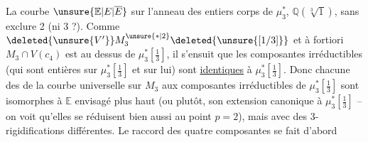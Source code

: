  La courbe $\unsure{\mathbb E|E|\overline E}$  sur  l'anneau des entiers  corps de $\mu_3^*$,  $\mathbb Q(\sqrt[3]{1})$,  sans exclure 2 (ni 3 ?). Comme $\deleted{\unsure{V'}}M_3^{\unsure{*|2}}\deleted{\unsure{[1/3]}}$ et à fortiori $M_3\cap V(c_4)$ est au dessus de $\mu_3^*[\frac13]$, il s'ensuit que les composantes irréductibles (qui sont entières sur $\mu_3^*[\frac13]$ et  sur lui) sont \uline{identiques} à $\mu_3^*[\frac13]$. Donc chacune des  de la courbe  universelle sur $M_3$ aux composantes irréductibles de $\mu_3^*[\frac13]$ sont isomorphes à $\mathbb E$ envisagé plus haut (ou plutôt, son extension canonique à $\mu_3^*[\frac13]$ -- on voit qu'elles se réduisent bien aussi au point $p=2$), mais avec des 3-rigidifications différentes. Le raccord des quatre composantes se fait d'abord \unsure{$\circ$}

